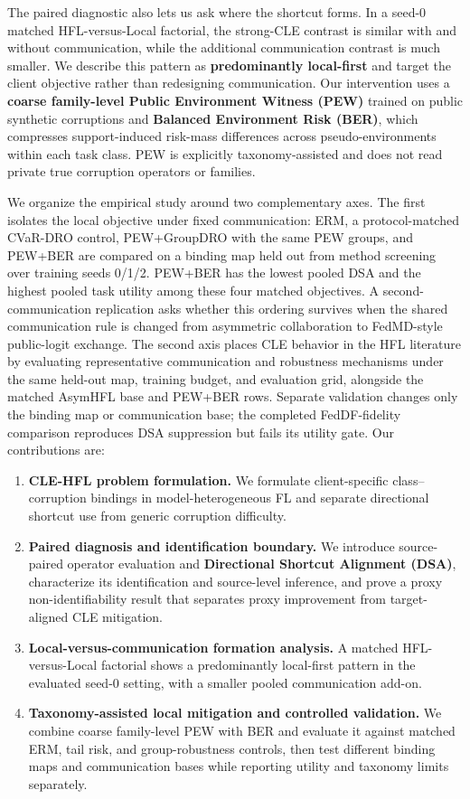 The paired diagnostic also lets us ask where the shortcut forms. In a seed-0 matched HFL-versus-Local factorial, the strong-CLE contrast is similar with and without communication, while the additional communication contrast is much smaller. We describe this pattern as \textbf{predominantly local-first} and target the client objective rather than redesigning communication. Our intervention uses a \textbf{coarse family-level Public Environment Witness (PEW)} trained on public synthetic corruptions and \textbf{Balanced Environment Risk (BER)}, which compresses support-induced risk-mass differences across pseudo-environments within each task class. PEW is explicitly taxonomy-assisted and does not read private true corruption operators or families.

We organize the empirical study around two complementary axes. The first isolates the local objective under fixed communication: ERM, a protocol-matched CVaR-DRO control, PEW+GroupDRO with the same PEW groups, and PEW+BER are compared on a binding map held out from method screening over training seeds 0/1/2. PEW+BER has the lowest pooled DSA and the highest pooled task utility among these four matched objectives. A second-communication replication asks whether this ordering survives when the shared communication rule is changed from asymmetric collaboration to FedMD-style public-logit exchange. The second axis places CLE behavior in the HFL literature by evaluating representative communication and robustness mechanisms under the same held-out map, training budget, and evaluation grid, alongside the matched AsymHFL base and PEW+BER rows. Separate validation changes only the binding map or communication base; the completed FedDF-fidelity comparison reproduces DSA suppression but fails its utility gate. Our contributions are:

\begin{enumerate}
\item \textbf{CLE-HFL problem formulation.} We formulate client-specific class--corruption bindings in model-heterogeneous FL and separate directional shortcut use from generic corruption difficulty.
\item \textbf{Paired diagnosis and identification boundary.} We introduce source-paired operator evaluation and \textbf{Directional Shortcut Alignment (DSA)}, characterize its identification and source-level inference, and prove a proxy non-identifiability result that separates proxy improvement from target-aligned CLE mitigation.
\item \textbf{Local-versus-communication formation analysis.} A matched HFL-versus-Local factorial shows a predominantly local-first pattern in the evaluated seed-0 setting, with a smaller pooled communication add-on.
\item \textbf{Taxonomy-assisted local mitigation and controlled validation.} We combine coarse family-level PEW with BER and evaluate it against matched ERM, tail risk, and group-robustness controls, then test different binding maps and communication bases while reporting utility and taxonomy limits separately.
\end{enumerate}


